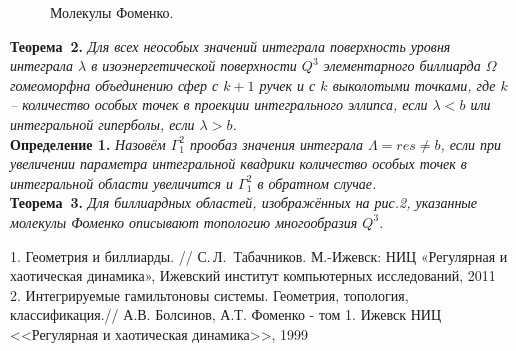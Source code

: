 \begin{figure}[h!]
	\caption{Молекулы Фоменко.}
\end{figure}

\textbf{Теорема~2.} {\it Для всех неособых значений интеграла повер\-хность уровня интеграла $\lambda$
	в изоэнергетичес\-кой поверхности $Q^3$ элементарного биллиарда $\Omega$ гомеоморфна объединению сфер с $k+1$ ручек и с $k$ выколотыми точками, где $k$ -- количество особых точек в проекции интегрального эллипса, если $\lambda<b$ или интегральной гиперболы, если $\lambda>b$.} \\
\textbf{Определение 1.} {\it
	Назовём $\Gamma^2_1$ прообаз значения интеграла $\varLambda = res \neq b$, если при увеличении параметра интегральной квадрики количество особых точек в интегральной области увеличится и $\Gamma^2_1$ в обратном случае. } \\
\textbf{Теорема~3.} {\it Для биллиардных областей, изображённых на рис.2, указанные молекулы Фоменко описывают топологию многообразия $Q^3$. }


\litlist

 1.  Геометрия и биллиарды. // С.\,Л.~Табачников. М.-Ижевск: НИЦ «Регулярная и хаотическая динамика», Ижевский институт компьютерных исследований,
2011 \\
2. Интегрируемые гамильтоновы системы. Геометрия, топология, классификация.// 	А.В. Болсинов, А.Т. Фоменко - том 1. Ижевск НИЦ	<<Регулярная и хаотическая динамика>>, 1999\\



